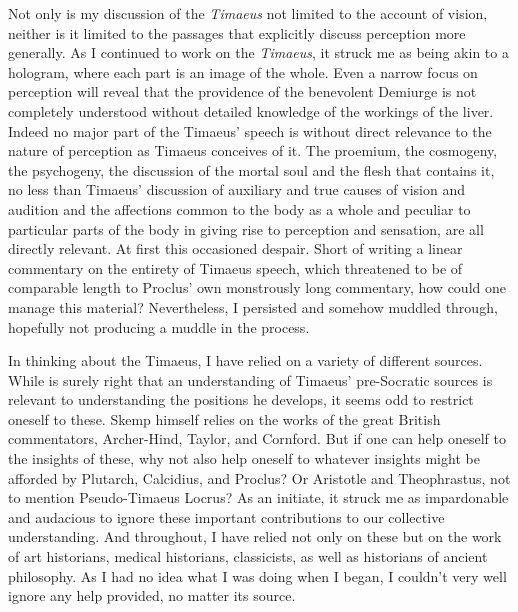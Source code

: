 Not only is my discussion of the \emph{Timaeus} not limited to the account of vision, neither is it limited to the passages that explicitly discuss perception more generally. As I continued to work on the \emph{Timaeus}, it struck me as being akin to a hologram, where each part is an image of the whole. Even a narrow focus on perception will reveal that the providence of the benevolent Demiurge is not completely understood without detailed knowledge of the workings of the liver. Indeed no major part of the Timaeus' speech is without direct relevance to the nature of perception as Timaeus conceives of it. The proemium, the cosmogeny, the psychogeny, the discussion of the mortal soul and the flesh that contains it, no less than Timaeus' discussion of auxiliary and true causes of vision and audition and the affections common to the body as a whole and peculiar to particular parts of the body in giving rise to perception and sensation, are all directly relevant. At first this occasioned despair. Short of writing a linear commentary on the entirety of Timaeus speech, which threatened to be of comparable length to Proclus' own monstrously long commentary, how could one manage this material? Nevertheless, I persisted and somehow muddled through, hopefully not producing a muddle in the process.

In thinking about the Timaeus, I have relied on a variety of different sources. While \citet{Skemp:1942oc} is surely right that an understanding of Timaeus' pre-Socratic sources is relevant to understanding the positions he develops, it seems odd to restrict oneself to these. Skemp himself relies on the works of the great British commentators, Archer-Hind, Taylor, and Cornford. But if one can help oneself to the insights of these, why not also help oneself to whatever insights might be afforded by Plutarch, Calcidius, and Proclus? Or Aristotle and Theophrastus, not to mention Pseudo-Timaeus Locrus? As an initiate, it struck me as impardonable and audacious to ignore these important contributions to our collective understanding. And throughout, I have relied not only on these but on the work of art historians, medical historians, classicists, as well as historians of ancient philosophy. As I had no idea what I was doing when I began, I couldn't very well ignore any help provided, no matter its source.

